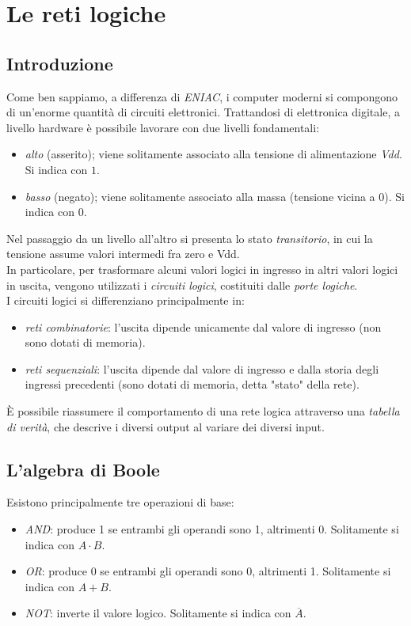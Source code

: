\documentclass[class=book, crop=false]{standalone}
\begin{document}
\chapter{Le reti logiche}
\section{Introduzione}
Come ben sappiamo, a differenza di \emph{ENIAC}, i computer moderni si compongono di un'enorme quantità di circuiti elettronici. Trattandosi di elettronica digitale, a livello hardware è possibile lavorare con due livelli fondamentali:
\begin{itemize}
	\item \emph{alto} (asserito); viene solitamente associato alla tensione di alimentazione \emph{Vdd}. Si indica con \(1\).
	\item \emph{basso} (negato); viene solitamente associato alla massa (tensione vicina a 0). Si indica con \(0\).
\end{itemize}

Nel passaggio da un livello all'altro si presenta lo stato \emph{transitorio}, in cui la tensione assume valori intermedi fra zero e Vdd.\\
In particolare, per trasformare alcuni valori logici in ingresso in altri valori logici in uscita, vengono utilizzati i \emph{circuiti logici}, costituiti dalle \emph{porte logiche}.\\
I circuiti logici si differenziano principalmente in:
\begin{itemize}
	\item \emph{reti combinatorie}: l'uscita dipende unicamente dal valore di ingresso (non sono dotati di memoria).
	\item \emph{reti sequenziali}: l'uscita dipende dal valore di ingresso e dalla storia degli ingressi precedenti (sono dotati di memoria, detta "stato" della rete).
\end{itemize}

\`{E} possibile riassumere il comportamento di una rete logica attraverso una \emph{tabella di verità}, che descrive i diversi output al variare dei diversi input.

\section{L'algebra di Boole}
Esistono principalmente tre operazioni di base:
\begin{itemize}
	\item \emph{AND}: produce 1 se entrambi gli operandi sono 1, altrimenti 0. Solitamente si indica con \(A\cdot B\).
	\item \emph{OR}: produce 0 se entrambi gli operandi sono 0, altrimenti 1. Solitamente si indica con \(A+B\).
	\item \emph{NOT}: inverte il valore logico. Solitamente si indica con \(\overline{A}\).
\end{itemize}
\end{document}
